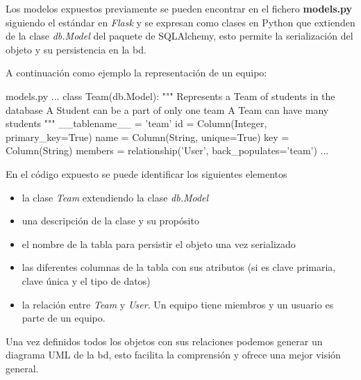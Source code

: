\documentclass[11pt,spanish,listoffigures,listoftables]{tfgetsinf}
\begin{document}
Los modelos expuestos previamente se pueden encontrar en el fichero \textbf{models.py} siguiendo el estándar en \textit{Flask} y se expresan como clases en Python que extienden de la clase \textit{db.Model} del paquete de SQLAlchemy, esto permite la serialización del objeto y su persistencia en la \Gls{bd}. 

A continuación como ejemplo la representación de un equipo:

\begin{code}{models.py}
...
	class Team(db.Model):
		"""
		Represents a Team of students in the database
		A Student can be a part of only one team
		A Team can have many students
		"""
		__tablename__ = 'team'
		id = Column(Integer, primary_key=True)
		name = Column(String, unique=True)
		key = Column(String)
		members = relationship('User', back_populates='team')
...
\end{code}

En el código expuesto se puede identificar los siguientes elementos

\begin{itemize}
	\item la clase \textit{Team} extendiendo la clase \textit{db.Model}
	\item una descripción de la clase y su propósito
	\item el nombre de la tabla para persistir el objeto una vez serializado
	\item las diferentes columnas de la tabla con sus atributos (si es clave primaria, clave única y el tipo de datos)
	\item la relación entre \textit{Team} y \textit{User}. Un equipo tiene miembros y un usuario es parte de un equipo.
\end{itemize}

Una vez definidos todos los objetos con sus relaciones podemos generar un diagrama UML de la \Gls{bd}, esto facilita la comprensión y ofrece una mejor visión general.
\end{document}
